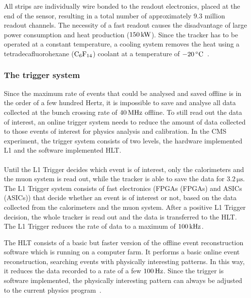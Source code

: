 All strips are individually wire bonded to the readout electronics, placed at the end of the sensor, resulting in a total number of approximately $9.3$ million readout channels. The necessity of a fast readout causes the disadvantage of large power consumption and heat production ($150\,\rm{kW}$). Since the tracker has to be operated at a constant temperature, a cooling system removes the heat using a tetradecafluorohexane ($\rm{C_6F_{14}}$) coolant at a temperature of $-20\,^{\circ}\rm{C}$~\cite{C+08}.

\subsubsection{The trigger system}\label{sec:trigger}
Since the maximum rate of events that could be analysed and saved offline is in the order of a few hundred Hertz, it is impossible to save and analyse all data collected at the bunch crossing rate of $40\,\rm{MHz}$ offline. To still read out the data of interest, an online trigger system needs to reduce the amount of data collected to those events of interest for physics analysis and calibration. In the \ac{CMS} experiment, the trigger system consists of two levels, the hardware implemented \ac{L1} and the software implemented \ac{HLT}.
\\
\\Until the \ac{L1} Trigger decides which event is of interest, only the calorimeters and the muon system is read out, while the tracker is able to save the data for $3.2\,\si{\micro \second}$. The \ac{L1} Trigger system consists of fast electronics (\acl{FPGA}s (\acs{FPGA}s) and \acl{ASIC}s (\acs{ASIC}s)) that decide whether an event is of interest or not, based on the data collected from the calorimeters and the muon system. After a positive \ac{L1} Trigger decision, the whole tracker is read out and the data is transferred to the \ac{HLT}. The \ac{L1} Trigger reduces the rate of data to a maximum of $100\,\rm{kHz}$.

The \ac{HLT} consists of a basic but faster version of the offline event reconstruction software which is running on a computer farm. It performs a basic online event reconstruction, searching events with physically interesting patterns. In this way, it reduces the data recorded to a rate of a few $100\,\rm{Hz}$. Since the trigger is software implemented, the physically interesting pattern can always be adjusted to the current physics program~\cite{C+08}.

